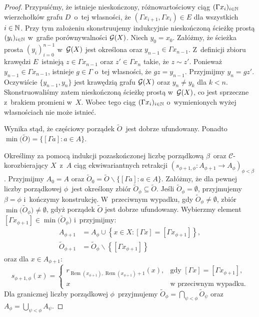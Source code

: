 \begin{proof}
Przypuśćmy, że istnieje nieskończony, różnowartościowy ciąg $(\Gamma x_i)_{i\in\mathbb{N}}$ wierzchołków grafu $D$~o~tej własności, że $(\Gamma x_{i+1},\Gamma x_{i})\in E$ dla wszystkich $i\in\mathbb{N}$. Przy tym założeniu skonstruujemy indukcyjnie nieskończoną ścieżkę prostą $(y_i)_{i\in\mathbb{N}}$ w~grafie porównywalności $\mathcal{G}(X)$. Niech $y_0=x_0$. Załóżmy, że ścieżka prosta $(y_i)_{i=0}^{n-1}$ w~$\mathcal{G}(X)$ jest określona oraz $y_{n-1}\in \Gamma x_{n-1}$. Z~definicji zbioru krawędzi $E$~istnieją $z\in \Gamma x_{n-1}$ oraz $z'\in \Gamma x_n$ takie, że $z\sim z'$. Ponieważ $y_{n-1}\in \Gamma x_{n-1}$, istnieje $g\in \Gamma$ o~tej własności, że $gz=y_{n-1}$. Przyjmijmy $y_n=gz'$. Oczywiście $\{y_{n-1},y_n\}$ jest krawędzią grafu $\mathcal{G}(X)$ oraz $y_n\not=y_k$ dla $k<n$. Skonstruowaliśmy zatem nieskończoną ścieżkę prostą w~$\mathcal{G}(X)$, co jest sprzeczne z~brakiem promieni w~$X$. Wobec tego ciąg $(\Gamma x_i)_{i\in\mathbb{N}}$ o~wymienionych wyżej własnościach nie może istnieć.

Wynika stąd, że częściowy porządek $\widetilde{O}$~jest dobrze ufundowany. Ponadto $\min\bigl(\widetilde{O}\bigr)=\{[\Gamma a]:a\in A\}$.

Określimy za pomocą indukcji pozaskończonej liczbę porządkową $\beta$~oraz \mbox{$\mathcal{C}$-korozbierający} $X$~z~$A$ ciąg ekwiwariantnych retrakcji $\left(s_{\phi+1,\phi}\colon A_{\phi+1}\to A_{\phi}\right)_{\phi<\beta}$. Przyjmijmy $A_0=A$ oraz $\widetilde{O}_0=\widetilde{O}\smallsetminus \{[\Gamma a]:a\in A\}$. Załóżmy, że dla pewnej liczby porządkowej $\phi$~jest określony zbiór $\widetilde{O}_\phi\subseteq \widetilde{O}$. Jeśli $\widetilde{O}_\phi=\emptyset$, przyjmujemy $\beta=\phi$ i~kończymy konstrukcję. W~przeciwnym wypadku, gdy $\widetilde{O}_\phi\not=\emptyset$, zbiór $\min\bigl(\widetilde{O}_\phi\bigr)\not=\emptyset$, gdyż porządek $\widetilde{O}$ jest dobrze ufundowany. Wybierzmy element $\left[\Gamma x_{\phi+1}\right]\in \min\bigl(\widetilde{O}_\phi\bigr)$ i~przyjmijmy: 
\begin{align*}A_{\phi+1}&=A_{\phi}\cup \left\{x\in X:[\Gamma x]=\left[\Gamma x_{\phi+1}\right]\right\},\\ \widetilde{O}_{\phi+1}&=\widetilde{O}_\phi\smallsetminus\left\{\left[\Gamma x_{\phi+1}\right]\right\}\end{align*} oraz dla $x\in A_{\phi+1}$: \[s_{\phi+1,\phi}(x)=\begin{cases}r_{\operatorname{Rem}\left(x_{\phi+1}\right),\operatorname{Rem}\left(x_{\phi+1}\right)+1}(x), & \text{gdy } [\Gamma x]=\left[\Gamma x_{\phi+1}\right],\\
x & \text{w przeciwnym wypadku.}
\end{cases}\]
Dla granicznej liczby porządkowej $\phi$~przyjmujemy $\widetilde{O}_\phi=\bigcap_{\psi<\phi}\widetilde{O}_\psi$ oraz $A_\phi=\bigcup_{\psi<\phi}A_\psi$.


\end{proof}
